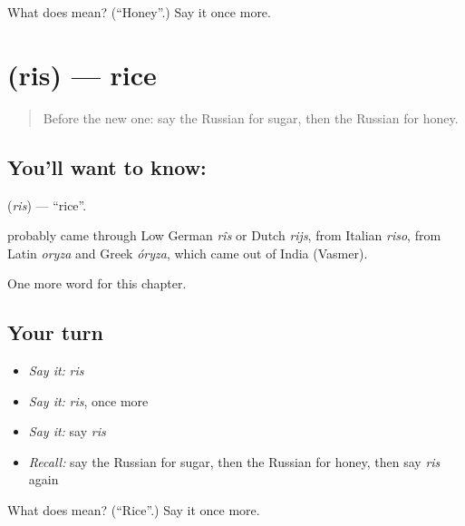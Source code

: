 \begin{tcolorbox}[breakable,colback=teal!4,colframe=teal!35!black,title={Before you move on}]
What does  mean? (\textquotedblleft{}Honey\textquotedblright{}.) Say it once more.
\end{tcolorbox}
\section[\texorpdfstring{\ru{рис} (ris)}{рис (ris)}]{ (ris) — rice}

\label{lesson:RU-C47-rice}



\begin{quote}
Before the new one: say the Russian for sugar, then the Russian for honey.
\end{quote}

\subsection*{You'll want to know: }
\textbf{} (\emph{ris}) — \textquotedblleft{}rice\textquotedblright{}.

\begin{cousinweb}
\textbf{} probably came through Low German \emph{rîs} or Dutch \emph{rijs}, from Italian \emph{riso}, from Latin \emph{oryza} and Greek \emph{óryza}, which came out of India (Vasmer).
\end{cousinweb}

\begin{grammarlens}[title={What you've built}]
One more word for this chapter.
\end{grammarlens}

\subsection*{Your turn}
\begin{itemize}
\raggedright
  \item \emph{Say it:} \emph{ris}
  \item \emph{Say it:} \emph{ris}, once more
  \item \emph{Say it:} say \emph{ris}
  \item \emph{Recall:} say the Russian for sugar, then the Russian for honey, then say \emph{ris} again
\end{itemize}

\begin{tcolorbox}[breakable,colback=teal!4,colframe=teal!35!black,title={Before you move on}]
What does  mean? (\textquotedblleft{}Rice\textquotedblright{}.) Say it once more.
\end{tcolorbox}
